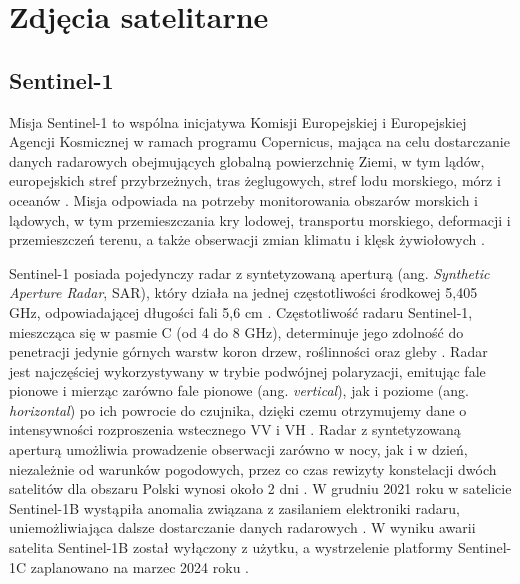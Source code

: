\documentclass{amuthesis}
\begin{document}
\hypertarget{sec-satellite-imagery}{%
\section{Zdjęcia satelitarne}\label{sec-satellite-imagery}}

\hypertarget{sec-sentinel1}{%
\subsection{Sentinel-1}\label{sec-sentinel1}}

Misja Sentinel-1 to wspólna inicjatywa Komisji Europejskiej i
Europejskiej Agencji Kosmicznej w ramach programu Copernicus, mająca na
celu dostarczanie danych radarowych obejmujących globalną powierzchnię
Ziemi, w tym lądów, europejskich stref przybrzeżnych, tras żeglugowych,
stref lodu morskiego, mórz i oceanów
\autocite{hejmanowska_2020_dane,sentinel1_mission_objectives}. Misja
odpowiada na potrzeby monitorowania obszarów morskich i lądowych, w tym
przemieszczania kry lodowej, transportu morskiego, deformacji i
przemieszczeń terenu, a także obserwacji zmian klimatu i klęsk
żywiołowych
\autocite{hejmanowska_2020_dane,sentinel1_mission_objectives}.

Sentinel-1 posiada pojedynczy radar z syntetyzowaną aperturą (ang.
\emph{Synthetic Aperture Radar}, SAR), który działa na jednej
częstotliwości środkowej 5,405 GHz, odpowiadającej długości fali 5,6 cm
\autocite{sentinel1_lulc,sentinel1_instrument_payload}. Częstotliwość
radaru Sentinel-1, mieszcząca się w pasmie C (od 4 do 8 GHz),
determinuje jego zdolność do penetracji jedynie górnych warstw koron
drzew, roślinności oraz gleby \autocite{sentinel_1_user_guide}. Radar
jest najczęściej wykorzystywany w trybie podwójnej polaryzacji, emitując
fale pionowe i mierząc zarówno fale pionowe (ang. \emph{vertical}), jak
i poziome (ang. \emph{horizontal}) po ich powrocie do czujnika, dzięki
czemu otrzymujemy dane o intensywności rozproszenia wstecznego VV i VH
\autocite{sentinel1_lulc}. Radar z syntetyzowaną aperturą umożliwia
prowadzenie obserwacji zarówno w nocy, jak i w dzień, niezależnie od
warunków pogodowych, przez co czas rewizyty konstelacji dwóch satelitów
dla obszaru Polski wynosi około 2 dni
\autocite{attema_2008_s1,sentinel1_revisit}. W grudniu 2021 roku w
satelicie Sentinel-1B wystąpiła anomalia związana z zasilaniem
elektroniki radaru, uniemożliwiająca dalsze dostarczanie danych
radarowych \autocite{sentinel_1b}. W wyniku awarii satelita Sentinel-1B
został wyłączony z użytku, a wystrzelenie platformy Sentinel-1C
zaplanowano na marzec 2024 roku
\autocite{sentinel_1b,sentinel1_eoportal}.
\end{document}

